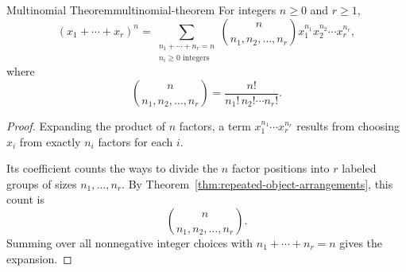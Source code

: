 \begin{theorem}{Multinomial Theorem}{multinomial-theorem}
  For integers $n\ge0$ and $r\ge1$,
  \[
    (x_1+\cdots+x_r)^n
    =\sum_{\substack{n_1+\cdots+n_r=n\\n_i\ge0\text{ integers}}}
    \binom{n}{n_1,n_2,\ldots,n_r}x_1^{n_1}x_2^{n_2}\cdots x_r^{n_r},
  \]
  where
  \[
    \binom{n}{n_1,n_2,\ldots,n_r}=\frac{n!}{n_1!\,n_2!\cdots n_r!}.
  \]
\end{theorem}

\begin{proof}
  Expanding the product of $n$ factors, a term $x_1^{n_1}\cdots x_r^{n_r}$ results from choosing $x_i$ from exactly $n_i$ factors for each $i$.

  Its coefficient counts the ways to divide the $n$ factor positions into $r$ labeled groups of sizes $n_1,\ldots,n_r$. By Theorem~\ref{thm:repeated-object-arrangements}, this count is
  \[
    \binom{n}{n_1,n_2,\ldots,n_r}.
  \]
  Summing over all nonnegative integer choices with $n_1+\cdots+n_r=n$ gives the expansion.
\end{proof}
